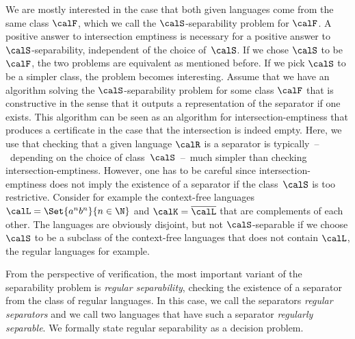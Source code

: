 \documentclass[../../diss.tex]{subfiles}
\begin{document}
\begin{problem}
\end{problem}

We are mostly interested in the case that both given languages come from the same class $\calF$, which we call the $\calS$-separability problem for $\calF$.
A positive answer to intersection emptiness is necessary for a positive answer to $\calS$-separability, independent of the choice of~$\calS$.
If we chose $\calS$ to be $\calF$, the two problems are equivalent as mentioned before.
If we pick $\calS$ to be a simpler class, the problem becomes interesting.
%
Assume that we have an algorithm solving the $\calS$-separability problem for some class $\calF$ that is constructive in the sense that it outputs a representation of the separator if one exists.
This algorithm can be seen as an algorithm for intersection-emptiness that produces a certificate in the case that the intersection is indeed empty.
Here, we use that checking that a given language $\calR$ is a separator is typically~--~depending on the choice of class~$\calS$~--~much simpler than checking intersection-emptiness.
%
However, one has to be careful since intersection-emptiness does not imply the existence of a separator if the class~$\calS$ is too restrictive.
Consider for example the context-free languages $\calL = \Set{a^n b^n}{n \in \N}$ and $\calK = \overline{\calL}$ that are complements of each other.
The languages are obviously disjoint, but not $\calS$-separable if we choose $\calS$ to be a subclass of the context-free languages that does not contain $\calL$, the regular languages for example.

From the perspective of verification, the most important variant of the separability problem is \emph{regular separability}, \ie checking the existence of a separator from the class of regular languages.
In this case, we call the separators \emph{regular separators} and we call two languages that have such a separator \emph{regularly separable}.
We formally state regular separability as a decision problem.

\begin{problem}
\end{problem}
\end{document}
